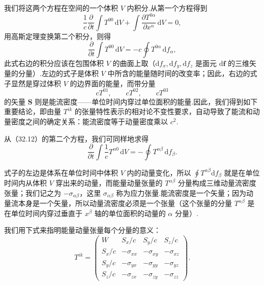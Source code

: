 我们将这两个方程在空间的一个体积 $V$ 内积分.从第一个方程得到
\begin{equation*}
  \frac{1}{c}\frac{\partial}{\partial t}\int T^{00}\,\mathrm{d}V
  +\int\frac{\partial T^{0\alpha}}{\partial x^\alpha}\,\mathrm{d}V=0,
\end{equation*}
用高斯定理变换第二个积分，则得
\begin{equation}
  \frac{\partial}{\partial t}\int T^{00}\,\mathrm{d}V
  =-c\oint T^{0\alpha}\,\mathrm{d}f_\alpha,
\end{equation}
此式右边的积分应该在包围体积 $V$ 的曲面上取（$\mathrm{d}f_x,\mathrm{d}f_y,\mathrm{d}f_z$
是面元 $\mathrm{d}\boldsymbol{f}$
的三维矢量的分量）.左边的式子是体积 $V$ 中所含的能量随时间的改变率；因此，右边的式子显然是穿过体积
$V$ 的边界面的能量，而带分量
\begin{equation*}
  cT^{01},\qquad cT^{02},\qquad cT^{03}
\end{equation*}
的矢量 $\boldsymbol{S}$
则是能流密度——单位时间内穿过单位面积的能量.因此，我们得到如下重要结论，即由量 $T^{ik}$
的张量特性表示的相对论不变性要求，自动导致了能流和动量密度之间的确定关系：能流密度等于动量密度乘以 $c^2$.

从（32.12）的第二个方程，我们可同样地求得
\begin{equation}
  \frac{\partial}{\partial t}\int\frac{1}{c}T^{\alpha 0}\,\mathrm{d}V
  =-\oint T^{\alpha\beta}\,\mathrm{d}f_\beta.
\end{equation}

式子的左边是体系在单位时间中体积 $V$
内的动量变化，所以 $\oint T^{\alpha\beta}\mathrm{d}f_\beta$
就是在单位时间内从体积 $V$ 穿出来的动量，而能量动量张量的 $T^{\alpha\beta}$
分量构成三维动量流密度张量；我们记之为 $-\sigma_{\alpha\beta}$，这里 $\sigma_{\alpha\beta}$
称为应力张量.能流密度是一个矢量；因为动量流本身是一个矢量，所以动量流密度必须是一个张量（这个张量的分量
$T^{\alpha\beta}$ 是在单位时间内穿过垂直于 $x^\beta$
轴的单位面积的动量的 $\alpha$ 分量）.

我们用下式来指明能量动量张量每个分量的意义：
\begin{equation}
  T^{ik}=
  \begin{pmatrix}
    W & S_x/c & S_y/c & S_z/c\\
    S_x/c & -\sigma_{xx} & -\sigma_{xy} & -\sigma_{xz}\\
    S_y/c & -\sigma_{yx} & -\sigma_{yy} & -\sigma_{yz}\\
    S_z/c & -\sigma_{zx} & -\sigma_{zy} & -\sigma_{zz}
  \end{pmatrix}.
\end{equation}

